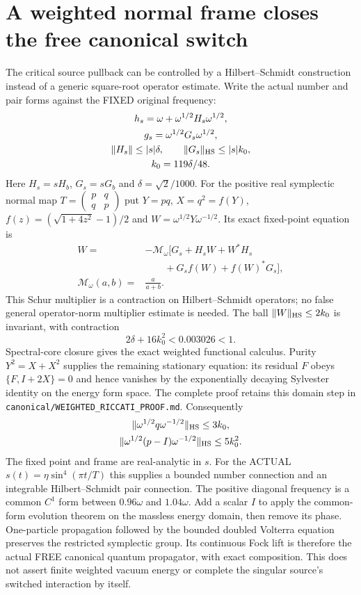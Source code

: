 \section{A weighted normal frame closes the free canonical switch}
The critical source pullback can be controlled by a Hilbert--Schmidt
construction instead of a generic square-root operator estimate.
Write the actual number and pair forms against the FIXED original frequency:
\[
 \begin{gathered}
 h_s=\omega+\omega^{1/2}H_s\omega^{1/2},\\
 g_s=\omega^{1/2}G_s\omega^{1/2},\\
 \|H_s\|\le |s|\delta,\qquad
 \|G_s\|_{\rm HS}\le |s|k_0,\\
 k_0=119\delta/48.
 \end{gathered}
\]
Here $H_s=sH_b$, $G_s=sG_b$ and $\delta=\sqrt2/1000$.
For the positive real symplectic normal map
$T=\left(\begin{smallmatrix}p&q\\q&p\end{smallmatrix}\right)$ put
$Y=pq$, $X=q^2=f(Y)$, $f(z)=(\sqrt{1+4z^2}-1)/2$ and
$W=\omega^{1/2}Y\omega^{-1/2}$.
Its exact fixed-point equation is
\[
 \begin{aligned}
 W={}&-\mathcal M_\omega\bigl[G_s+H_sW+W^*H_s\\
     &\qquad{}+G_sf(W)+f(W)^*G_s\bigr],\\
 \mathcal M_\omega(a,b)={}&\frac a{a+b}.
 \end{aligned}
\]
This Schur multiplier is a contraction on Hilbert--Schmidt operators;
no false general operator-norm multiplier estimate is needed.
The ball $\|W\|_{\rm HS}\le2k_0$ is invariant, with contraction
\[
 2\delta+16k_0^2<0.003026<1.
\]
Spectral-core closure gives the exact weighted functional calculus.
Purity $Y^2=X+X^2$ supplies the remaining stationary equation:
its residual $F$ obeys $\{F,I+2X\}=0$ and hence vanishes by the
exponentially decaying Sylvester identity on the energy form space.
The complete proof retains this domain step in
\texttt{canonical/}\allowbreak\texttt{WEIGHTED\_RICCATI\_PROOF.md}.
Consequently
\[
 \begin{gathered}
 \|\omega^{1/2}q\omega^{-1/2}\|_{\rm HS}\le3k_0,\\
 \|\omega^{1/2}(p-I)\omega^{-1/2}\|_{\rm HS}\le5k_0^2.
 \end{gathered}
\]
The fixed point and frame are real-analytic in $s$. For the ACTUAL
$s(t)=\eta\sin^4(\pi t/T)$ this supplies a bounded number connection
and an integrable Hilbert--Schmidt pair connection. The positive diagonal
frequency is a common $C^1$ form between $0.96\omega$ and $1.04\omega$.
Add a scalar $I$ to apply the common-form evolution theorem on the
massless energy domain, then remove its phase. One-particle propagation
followed by the bounded doubled Volterra equation preserves the restricted
symplectic group. Its continuous Fock lift is therefore the actual FREE
canonical quantum propagator, with exact composition. This does not
assert finite weighted vacuum energy or complete the singular source's
switched interaction by itself.

